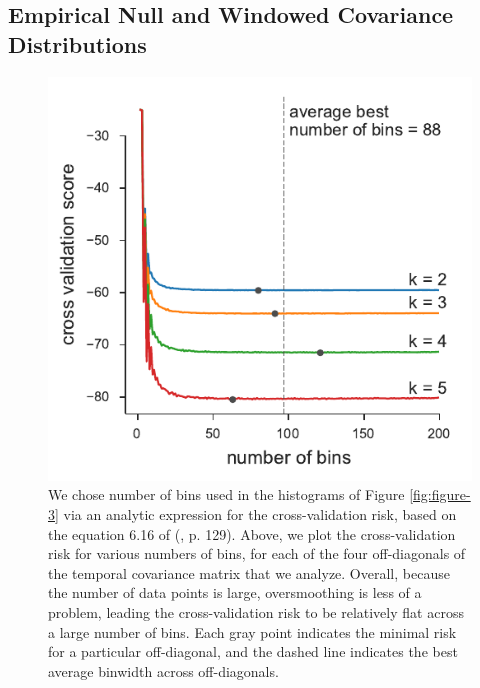 \documentclass[11pt]{article}
\begin{document}
\subsection{\textcite{Barghi2019-qy} Empirical Null and Windowed Covariance Distributions}

\begin{figure}[!ht]
  \centering
  \includegraphics[]{figures/barghi-cross-validation-binsize.pdf}

  \caption{We chose number of bins used in the histograms of Figure
    \ref{fig:figure-3} via an analytic expression for the cross-validation
    risk, based on the equation 6.16 of (\cite{Wasserman2006-jl}, p. 129).
    Above, we plot the cross-validation risk for various numbers of bins, for
    each of the four off-diagonals of the temporal covariance matrix that we
    analyze. Overall, because the number of data points is large, oversmoothing
    is less of a problem, leading the cross-validation risk to be relatively
    flat across a large number of bins. Each gray point indicates the minimal
    risk for a particular off-diagonal, and the dashed line indicates the best
    average binwidth across off-diagonals.}
  \label{suppfig:barghi-cross-validation-binsize}
\end{figure}
\end{document}
